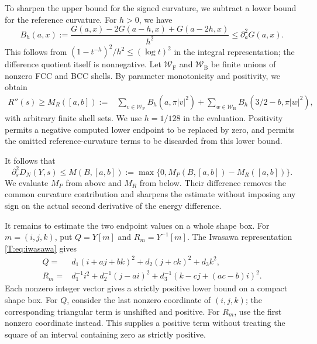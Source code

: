 \documentclass[reqno,english]{amsart}
\theoremstyle{definition}
\newtheorem{open problem}[theorem]{Open Problem}
\theoremstyle{remark}
\theoremstyle{plain}
\numberwithin{equation}{section}
\begin{document}
To sharpen the upper bound for the signed curvature, we subtract a
lower bound for the reference curvature. For $h>0$, we have
\begin{equation}
 B_h(a,x):=\frac{G(a,x)-2G(a-h,x)+G(a-2h,x)}{h^2}
 \le\partial_a^2G(a,x).
 \label{E:eq:backward-curvature}
\end{equation}
This follows from $(1-t^{-h})^2/h^2\le(\log t)^2$ in the
integral representation; the difference quotient itself is
nonnegative. Let $\mathcal W_{\mathrm F}$ and
$\mathcal W_{\mathrm B}$ be finite unions of nonzero FCC and BCC
shells. By parameter monotonicity and positivity, we obtain
\begin{align}
 R''(s)\ge M_R([a,b]):={}&
 \sum_{v\in\mathcal W_{\mathrm F}}B_h(a,\pi|v|^2)
 +\sum_{w\in\mathcal W_{\mathrm B}}B_h(3/2-b,\pi|w|^2),
 \label{E:eq:reference-curvature}
\end{align}
with arbitrary finite shell sets. We use $h=1/128$ in the
evaluation. Positivity permits a negative computed lower endpoint
to be replaced by zero, and permits the omitted reference-curvature
terms to be discarded from this lower bound.

It follows that
\begin{equation}
 \partial_s^2D_N(Y,s)\le
 M(B,[a,b]):=\max\{0,M_P(B,[a,b])-M_R([a,b])\}.
 \label{E:eq:signed-curvature}
\end{equation}
We evaluate $M_P$ from above and $M_R$ from below.
Their difference removes the common curvature contribution and
sharpens the estimate without imposing any sign on the actual
second derivative of the energy difference.

It remains to estimate the two endpoint values on a whole shape
box. For $m=(i,j,k)$, put $Q=Y[m]$ and $R_m=Y^{-1}[m]$.
The Iwasawa representation \eqref{T:eq:iwasawa} gives
\begin{align}
 Q={}&d_1(i+aj+bk)^2+d_2(j+ck)^2+d_3k^2,\\
 R_m={}&d_1^{-1}i^2+d_2^{-1}(j-ai)^2
       +d_3^{-1}(k-cj+(ac-b)i)^2.
 \label{E:eq:explicit-forms}
\end{align}
Each nonzero integer vector gives a strictly positive lower bound
on a compact shape box. For $Q$, consider the last nonzero
coordinate of $(i,j,k)$; the corresponding triangular term is
unshifted and positive. For $R_m$, use the first nonzero
coordinate instead. This supplies a positive term without treating
the square of an interval containing zero as strictly positive.
\end{document}

